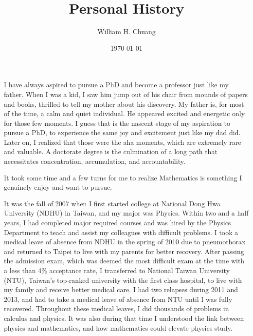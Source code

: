 \documentclass[10pt]{amsart}
\begin{document}
\title{Personal History}
\author{William H. Chuang}
\date{\today}
\maketitle



I have always aspired to pursue a PhD and become a professor just like my father. When I was a kid, I saw him jump out of his chair from mounds of papers and books, thrilled to tell my mother about his discovery. My father is, for most of the time, a calm and quiet individual. He appeared excited and energetic only for those few moments. I guess that is the nascent stage of my aspiration to pursue a PhD, to experience the same joy and excitement just like my dad did. Later on, I realized that those were the aha moments, which are extremely rare and valuable. A doctorate degree is the culmination of a long path that necessitates concentration, accumulation, and accountability. %



It took some time and a few turns for me to realize Mathematics is something I genuinely enjoy and want to pursue. 

It was the fall of 2007 when I first started college at National Dong Hwa University (NDHU) in Taiwan, and my major was Physics. Within two and a half years, I had completed major required courses and was hired by the Physics Department to teach and assist my colleagues with difficult problems. I took a medical leave of absence from NDHU in the spring of 2010 due to pneumothorax and returned to Taipei to live with my parents for better recovery. After passing the admission exam, which was deemed the most difficult exam at the time with a less than 4$\%$ acceptance rate, I transferred to National Taiwan University (NTU), Taiwan's top-ranked university with the first class hospital, to live with my family and receive better medical care. I had two relapses during 2011 and 2013, and had to take a medical leave of absence from NTU until I was fully recovered. Throughout these medical leaves, I did thousands of problems in calculus and physics. It was also during that time I understood the link between physics and mathematics, and how mathematics could elevate physics study.
\end{document}
